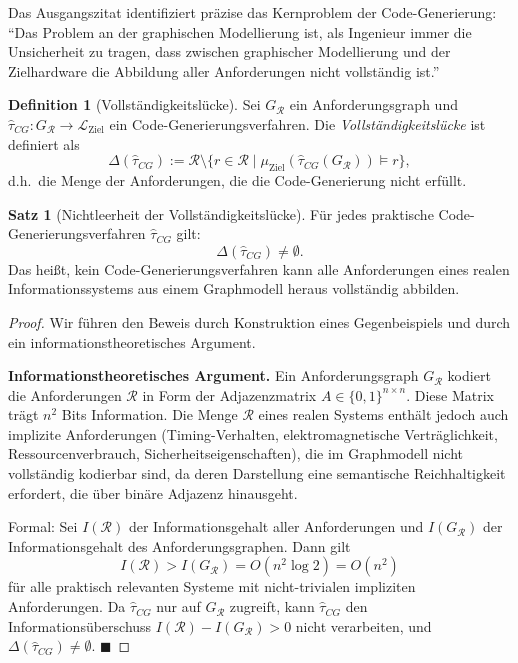 ﻿\documentclass[a4paper,12pt]{article}
\theoremstyle{definition}
\newtheorem{definition}{Definition}
\newtheorem{satz}{Satz}
\begin{document}
Das Ausgangszitat identifiziert präzise das Kernproblem der Code-Generierung:
\enquote{Das Problem an der graphischen Modellierung ist, als Ingenieur immer die Unsicherheit
zu tragen, dass zwischen graphischer Modellierung und der Zielhardware die Abbildung aller
Anforderungen nicht vollständig ist.}

\begin{definition}[Vollständigkeitslücke]
\label{def:vollstaendigkeit}
Sei $G_\mathcal{R}$ ein Anforderungsgraph und $\hat{\tau}_{CG}: G_\mathcal{R} \to \mathcal{L}_{\text{Ziel}}$
ein Code-Generierungsverfahren. Die \emph{Vollständigkeitslücke} ist definiert als
\[
  \Delta(\hat{\tau}_{CG}) := \mathcal{R} \setminus \{r \in \mathcal{R} \mid
  \mu_{\text{Ziel}}(\hat{\tau}_{CG}(G_\mathcal{R})) \models r\},
\]
d.h.\ die Menge der Anforderungen, die die Code-Generierung nicht erfüllt.
\end{definition}

\begin{satz}[Nichtleerheit der Vollständigkeitslücke]
\label{satz:luecke}
Für jedes praktische Code-Generierungsverfahren $\hat{\tau}_{CG}$ gilt:
\[
  \Delta(\hat{\tau}_{CG}) \neq \emptyset.
\]
Das heißt, kein Code-Generierungsverfahren kann alle Anforderungen eines realen
Informationssystems aus einem Graphmodell heraus vollständig abbilden.
\end{satz}

\begin{proof}
Wir führen den Beweis durch Konstruktion eines Gegenbeispiels und durch ein
informationstheoretisches Argument.

\textbf{Informationstheoretisches Argument.}
Ein Anforderungsgraph $G_\mathcal{R}$ kodiert die Anforderungen $\mathcal{R}$ in Form
der Adjazenzmatrix $A \in \{0,1\}^{n \times n}$. Diese Matrix trägt $n^2$ Bits Information.
Die Menge $\mathcal{R}$ eines realen Systems enthält jedoch auch implizite Anforderungen
(Timing-Verhalten, elektromagnetische Verträglichkeit, Ressourcenverbrauch, Sicherheitseigenschaften),
die im Graphmodell nicht vollständig kodierbar sind, da deren Darstellung eine
semantische Reichhaltigkeit erfordert, die über binäre Adjazenz hinausgeht.

Formal: Sei $I(\mathcal{R})$ der Informationsgehalt aller Anforderungen und
$I(G_\mathcal{R})$ der Informationsgehalt des Anforderungsgraphen. Dann gilt
\[
  I(\mathcal{R}) > I(G_\mathcal{R}) = O(n^2 \log 2) = O(n^2)
\]
für alle praktisch relevanten Systeme mit nicht-trivialen impliziten Anforderungen.
Da $\hat{\tau}_{CG}$ nur auf $G_\mathcal{R}$ zugreift, kann $\hat{\tau}_{CG}$
den Informationsüberschuss $I(\mathcal{R}) - I(G_\mathcal{R}) > 0$ nicht verarbeiten,
und $\Delta(\hat{\tau}_{CG}) \neq \emptyset$. $\blacksquare$
\end{proof}
\end{document}
